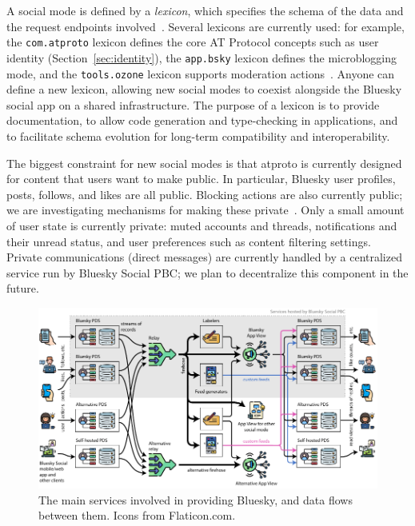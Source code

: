 \documentclass[sigconf]{acmart}
\begin{document}
A social mode is defined by a \emph{lexicon}, which specifies the schema of the data and the request endpoints involved~\cite{AtProtoSpecs}.
Several lexicons are currently used: for example, the \texttt{com.atproto} lexicon defines the core AT Protocol concepts such as user identity (Section~\ref{sec:identity}), the \texttt{app.bsky} lexicon defines the microblogging mode, and the \texttt{tools.ozone} lexicon supports moderation actions~\cite{BlueskyLexicons}.
Anyone can define a new lexicon, allowing new social modes to coexist alongside the Bluesky social app on a shared infrastructure.
The purpose of a lexicon is to provide documentation, to allow code generation and type-checking in applications, and to facilitate schema evolution for long-term compatibility and interoperability.

The biggest constraint for new social modes is that atproto is currently designed for content that users want to make public.
In particular, Bluesky user profiles, posts, follows, and likes are all public.
Blocking actions are also currently public; we are investigating mechanisms for making these private~\cite{PublicBlocks,PrivateBlocks}.
Only a small amount of user state is currently private: muted accounts and threads, notifications and their unread status, and user preferences such as content filtering settings.
Private communications (direct messages) are currently handled by a centralized service run by Bluesky Social PBC; we plan to decentralize this component in the future.

\begin{figure}
    \centering
    \includegraphics[width=\linewidth]{architecture.pdf}
    \caption{The main services involved in providing Bluesky, and data flows between them. Icons from Flaticon.com.}
    \label{fig:indexing}
\end{figure}
\end{document}
